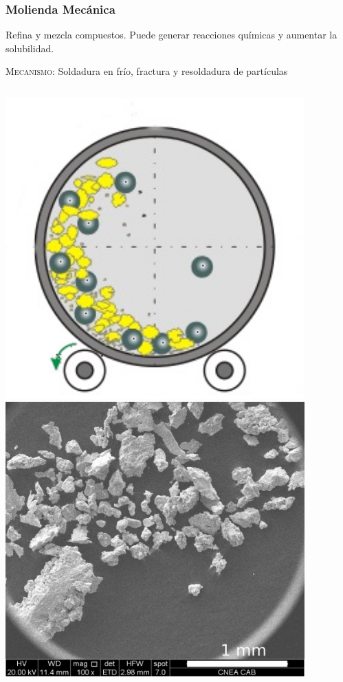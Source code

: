 \documentclass[usenames,dvipsnames]{beamer}
\begin{document}
\begin{frame}

\frametitle{Molienda Mecánica}

Refina y mezcla compuestos. Puede generar reacciones químicas y aumentar la solubilidad.

\textsc{Mecanismo:} Soldadura en frío, fractura y resoldadura de partículas

\begin{columns}
 \includegraphics[width=0.9\textwidth]{img/tamgrano/MoliendaBolas.jpg}
 \includegraphics[width=0.9\textwidth]{img/tamgrano/Polvo.png}
\begin{small}


\end{small}
\end{columns}
\end{frame}
\end{document}
